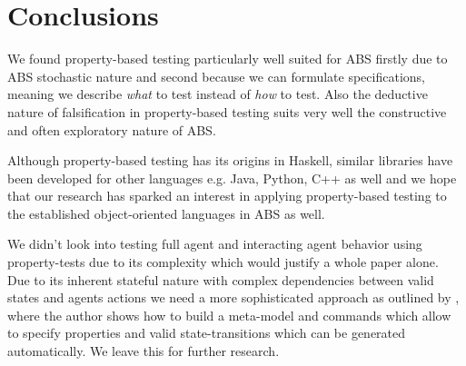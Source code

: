 \section{Conclusions}
\label{sec:conclusions}

We found property-based testing particularly well suited for ABS firstly due to ABS stochastic nature and second because we can formulate specifications, meaning we describe \textit{what} to test instead of \textit{how} to test. Also the deductive nature of falsification in property-based testing suits very well the constructive and often exploratory nature of ABS. 

Although property-based testing has its origins in Haskell, similar libraries have been developed for other languages e.g. Java, Python, C++ as well and we hope that our research has sparked an interest in applying property-based testing to the established object-oriented languages in ABS as well.

We didn't look into testing full agent and interacting agent behavior using property-tests due to its complexity which would justify a whole paper alone. Due to its inherent stateful nature with complex dependencies between valid states and agents actions we need a more sophisticated approach as outlined by , where the author shows how to build a meta-model and commands which allow to specify properties and valid state-transitions which can be generated automatically. We leave this for further research.